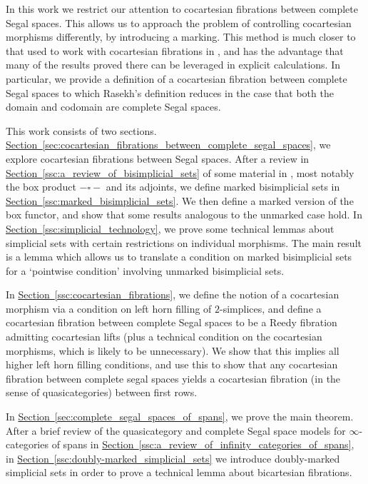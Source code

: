 \documentclass[main.tex]{subfiles}
\begin{document}
In this work we restrict our attention to cocartesian fibrations between complete Segal spaces. This allows us to approach the problem of controlling cocartesian morphisms differently, by introducing a marking. This method is much closer to that used to work with cocartesian fibrations in \cite{highertopostheory}, and has the advantage that many of the results proved there can be leveraged in explicit calculations. In particular, we provide a definition of a cocartesian fibration between complete Segal spaces to which Rasekh's definition reduces in the case that both the domain and codomain are complete Segal spaces.

This work consists of two sections. \hyperref[sec:cocartesian_fibrations_between_complete_segal_spaces]{Section~\ref*{sec:cocartesian_fibrations_between_complete_segal_spaces}}, we explore cocartesian fibrations between Segal spaces. After a review in \hyperref[ssc:a_review_of_bisimplicial_sets]{Section~\ref*{ssc:a_review_of_bisimplicial_sets}} of some material in \cite{qcats_vs_segal_spaces}, most notably the box product $- \square -$ and its adjoints, we define marked bisimplicial sets in \hyperref[ssc:marked_bisimplicial_sets]{Section~\ref*{ssc:marked_bisimplicial_sets}}. We then define a marked version of the box functor, and show that some results analogous to the unmarked case hold. In \hyperref[ssc:simplicial_technology]{Section~\ref*{ssc:simplicial_technology}}, we prove some technical lemmas about simplicial sets with certain restrictions on individual morphisms. The main result is a lemma which allows us to translate a condition on marked bisimplicial sets for a `pointwise condition' involving unmarked bisimplicial sets.

In \hyperref[ssc:cocartesian_fibrations]{Section~\ref*{ssc:cocartesian_fibrations}}, we define the notion of a cocartesian morphism via a condition on left horn filling of $2$-simplices, and define a cocartesian fibration between complete Segal spaces to be a Reedy fibration admitting cocartesian lifts (plus a technical condition on the cocartesian morphisms, which is likely to be unnecessary). We show that this implies all higher left horn filling conditions, and use this to show that any cocartesian fibration between complete segal spaces yields a cocartesian fibration (in the sense of quasicategories) between first rows.

In \hyperref[sec:complete_segal_spaces_of_spans]{Section~\ref*{sec:complete_segal_spaces_of_spans}}, we prove the main theorem. After a brief review of the quasicategory and complete Segal space models for $\infty$-categories of spans in \hyperref[ssc:a_review_of_infinity_categories_of_spans]{Section~\ref*{ssc:a_review_of_infinity_categories_of_spans}}, in \hyperref[ssc:doubly-marked_simplicial_sets]{Section~\ref*{ssc:doubly-marked_simplicial_sets}} we introduce doubly-marked simplicial sets in order to prove a technical lemma about bicartesian fibrations. 
\end{document}

